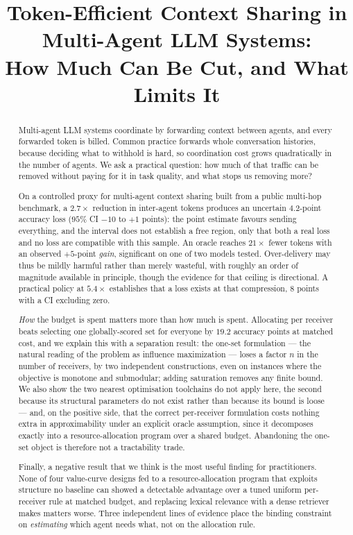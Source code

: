 \documentclass[sigconf,anonymous]{aamas}
\theoremstyle{remark}
\begin{document}
\title{Token-Efficient Context Sharing in Multi-Agent LLM Systems:\\
How Much Can Be Cut, and What Limits It}

\begin{abstract}
Multi-agent LLM systems coordinate by forwarding context between
agents, and every forwarded token is billed. Common practice forwards
whole conversation histories, because deciding what to withhold is
hard, so coordination cost grows quadratically in the number of
agents. We ask a practical question: how much of that traffic can be
removed without paying for it in task quality, and what stops us
removing more?

On a controlled proxy for multi-agent context sharing built from a
public multi-hop benchmark, a $2.7\times$ reduction in inter-agent
tokens produces an uncertain $4.2$-point accuracy loss ($95\%$ CI
$-10$ to $+1$ points): the point estimate favours sending everything,
and the interval does not establish a free region, only that both a
real loss and no loss are compatible with this sample. An oracle
reaches $21\times$ fewer tokens with an observed $+5$-point
\emph{gain}, significant on one of two models tested. Over-delivery
may thus be mildly harmful rather than merely wasteful, with roughly
an order of magnitude available in principle, though the evidence for
that ceiling is directional. A practical policy at $5.4\times$
establishes that a loss exists at that compression, $8$ points with a
CI excluding zero.

\emph{How} the budget is spent matters more than how much is spent.
Allocating per receiver beats selecting one globally-scored set for
everyone by $19.2$ accuracy points at matched cost, and we explain this
with a separation result: the one-set formulation --- the natural
reading of the problem as influence maximization --- loses a factor
$n$ in the number of receivers, by two independent constructions, even
on instances where the objective is monotone and submodular; adding
saturation removes any finite bound. We also show the two nearest
optimisation toolchains do not apply here, the second because its
structural parameters do not exist rather than because its bound is
loose --- and, on the positive side, that the correct per-receiver
formulation costs nothing extra in approximability under an explicit
oracle assumption, since it decomposes exactly into a resource-allocation
program over a shared budget. Abandoning the one-set object is
therefore not a tractability trade.

Finally, a negative result that we think is the most useful finding
for practitioners. None of four value-curve designs fed to a
resource-allocation program that exploits structure no baseline can
showed a detectable advantage over a tuned uniform per-receiver rule
at matched budget, and replacing lexical relevance with a dense
retriever makes matters worse. Three independent lines of evidence
place the binding constraint on \emph{estimating} which agent needs
what, not on the allocation rule.
\end{abstract}
\end{document}
